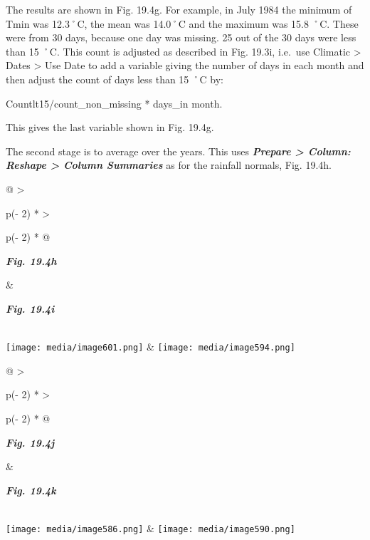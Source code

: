 \documentclass[
  letterpaper,
  DIV=11,
  numbers=noendperiod]{scrreprt}
\begin{document}
The results are shown in Fig. 19.4g. For example, in July 1984 the
minimum of Tmin was 12.3˚C, the mean was 14.0˚C and the maximum was 15.8
˚C. These were from 30 days, because one day was missing. 25 out of the
30 days were less than 15 ˚C. This count is adjusted as described in
Fig. 19.3i, i.e.~use Climatic \textgreater{} Dates \textgreater{} Use
Date to add a variable giving the number of days in each month and then
adjust the count of days less than 15 ˚C by:

Countlt15/count\_non\_missing * days\_in month.

This gives the last variable shown in Fig. 19.4g.

The second stage is to average over the years. This uses
\textbf{\emph{Prepare \textgreater{} Column: Reshape \textgreater{}
Column Summaries}} as for the rainfall normals, Fig. 19.4h.

\begin{longtable}[]{@{}
  >{\raggedright\arraybackslash}p{(\columnwidth - 2\tabcolsep) * }
  >{\raggedright\arraybackslash}p{(\columnwidth - 2\tabcolsep) * }@{}}
\toprule\noalign{}
\begin{minipage}[b]{\linewidth}\raggedright
\textbf{\emph{Fig. 19.4h}}
\end{minipage} & \begin{minipage}[b]{\linewidth}\raggedright
\textbf{\emph{Fig. 19.4i}}
\end{minipage} \\
\midrule\noalign{}
\endhead
\bottomrule\noalign{}
\endlastfoot
\texttt{[image: media/image601.png]} &
\texttt{[image: media/image594.png]} \\
\end{longtable}

\begin{longtable}[]{@{}
  >{\raggedright\arraybackslash}p{(\columnwidth - 2\tabcolsep) * }
  >{\raggedright\arraybackslash}p{(\columnwidth - 2\tabcolsep) * }@{}}
\toprule\noalign{}
\begin{minipage}[b]{\linewidth}\raggedright
\textbf{\emph{Fig. 19.4j}}
\end{minipage} & \begin{minipage}[b]{\linewidth}\raggedright
\textbf{\emph{Fig. 19.4k}}
\end{minipage} \\
\midrule\noalign{}
\endhead
\bottomrule\noalign{}
\endlastfoot
\texttt{[image: media/image586.png]} &
\texttt{[image: media/image590.png]} \\
\end{longtable}
\end{document}
